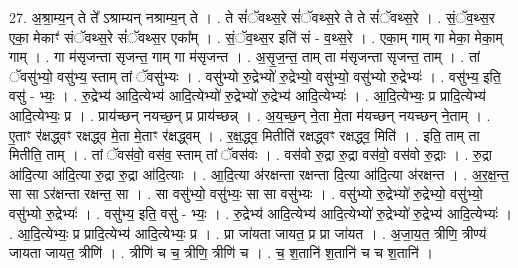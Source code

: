 \documentclass[17pt]{extarticle}
\begin{document}
27. अ॒श्रा॒म्य॒न् ते ते᳚ ऽश्राम्यन् नश्राम्य॒न् ते । . ते सं॑ॅवथ्स॒रे सं॑ॅवथ्स॒रे ते ते सं॑ॅवथ्स॒रे । . सं॒ॅव॒थ्स॒र एका॒ मेकाꣳ॑ संॅवथ्स॒रे सं॑ॅवथ्स॒र एका᳚म् । . सं॒ॅव॒थ्स॒र इति॑ सं - व॒थ्स॒रे । . एका॒म् गाम् गा मेका॒ मेका॒म् गाम् । . गा म॑सृजन्ता सृजन्त॒ गाम् गा म॑सृजन्त । . अ॒सृ॒ज॒न्त॒ ताम् ता म॑सृजन्ता सृजन्त॒ ताम् । . तां ॅवसु॑भ्यो॒ वसु॑भ्य॒ स्ताम् तां ॅवसु॑भ्यः । . वसु॑भ्यो रु॒द्रेभ्यो॑ रु॒द्रेभ्यो॒ वसु॑भ्यो॒ वसु॑भ्यो रु॒द्रेभ्यः॑ । . वसु॑भ्य॒ इति॒ वसु॑ - भ्यः॒ । . रु॒द्रेभ्य॑ आदि॒त्येभ्य॑ आदि॒त्येभ्यो॑ रु॒द्रेभ्यो॑ रु॒द्रेभ्य॑ आदि॒त्येभ्यः॑ । . आ॒दि॒त्येभ्यः॒ प्र प्रादि॒त्येभ्य॑ आदि॒त्येभ्यः॒ प्र । . प्राय॑च्छन् नयच्छ॒न् प्र प्राय॑च्छन्न् । . अ॒य॒च्छ॒न् ने॒ता मे॒ता म॑यच्छन् नयच्छन् ने॒ताम् । . ए॒ताꣳ र॑क्षद्ध्वꣳ रक्षद्ध्व मे॒ता मे॒ताꣳ र॑क्षद्ध्वम् । . र॒क्ष॒द्ध्व॒ मितीति॑ रक्षद्ध्वꣳ रक्षद्ध्व॒ मिति॑ । . इति॒ ताम् ता मितीति॒ ताम् । . तां ॅवस॑वो॒ वस॑व॒ स्ताम् तां ॅवस॑वः । . वस॑वो रु॒द्रा रु॒द्रा वस॑वो॒ वस॑वो रु॒द्राः । . रु॒द्रा आ॑दि॒त्या आ॑दि॒त्या रु॒द्रा रु॒द्रा आ॑दि॒त्याः । . आ॒दि॒त्या अ॑रक्षन्ता रक्षन्ता दि॒त्या आ॑दि॒त्या अ॑रक्षन्त । . अ॒र॒क्ष॒न्त॒ सा सा ऽर॑क्षन्ता रक्षन्त॒ सा । . सा वसु॑भ्यो॒ वसु॑भ्यः॒ सा सा वसु॑भ्यः । . वसु॑भ्यो रु॒द्रेभ्यो॑ रु॒द्रेभ्यो॒ वसु॑भ्यो॒ वसु॑भ्यो रु॒द्रेभ्यः॑ । . वसु॑भ्य॒ इति॒ वसु॑ - भ्यः॒ । . रु॒द्रेभ्य॑ आदि॒त्येभ्य॑ आदि॒त्येभ्यो॑ रु॒द्रेभ्यो॑ रु॒द्रेभ्य॑ आदि॒त्येभ्यः॑ । . आ॒दि॒त्येभ्यः॒ प्र प्रादि॒त्येभ्य॑ आदि॒त्येभ्यः॒ प्र । . प्रा जा॑यता जायत॒ प्र प्रा जा॑यत । . अ॒जा॒य॒त॒ त्रीणि॒ त्रीण्य॑ जायता जायत॒ त्रीणि॑ । . त्रीणि॑ च च॒ त्रीणि॒ त्रीणि॑ च । . च॒ श॒तानि॑ श॒तानि॑ च च श॒तानि॑ । \newline
\end{document}
